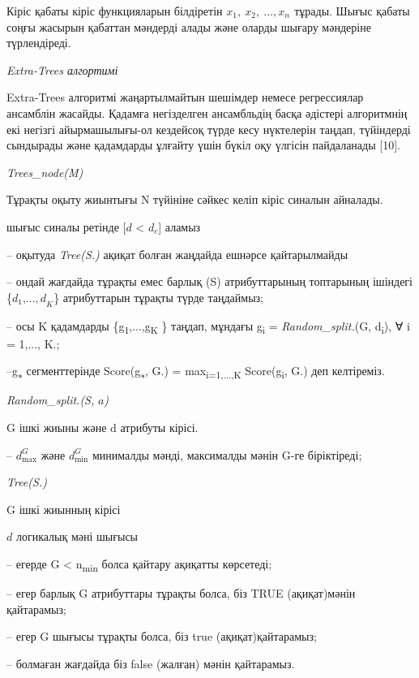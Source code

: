 \begin{multicols}{2}
Кіріс қабаты кіріс функцияларын білдіретін
\(x_{1},\ x_{2},\ ...,x_{n\ }\ \)тұрады. Шығыс қабаты соңғы жасырын
қабаттан мәндерді алады және оларды шығару мәндеріне түрлендіреді.

\emph{Extra-Trees алгортимі}

Extra-Trees алгоритмі жаңартылмайтын шешімдер немесе регрессиялар
ансамблін жасайды. Қадамға негізделген ансамбльдің басқа әдістері
алгоритмнің екі негізгі айырмашылығы-ол кездейсоқ түрде кесу нүктелерін
таңдап, түйіндерді сындырады және қадамдарды ұлғайту үшін бүкіл оқу
үлгісін пайдаланады {[}10{]}.

\emph{Trees\_node(M)}

Тұрақты оқыту жиынтығы N түйініне сәйкес келіп кіріс синалын айналады.

шығыс синалы ретінде {[}\(d\) \textless{} \(d_{c}\){]} аламыз

-- оқытуда \emph{Tree(S.)} ақиқат болған жаңдайда ешнәрсе қайтарылмайды

-- ондай жағдайда тұрақты емес барлық (S) атрибуттарының топтарының
ішіндегі \{\(d_{1}\),...\({,d}_{K}\)\} атрибуттарын тұрақты түрде
таңдаймыз;

-- осы K қадамдарды \{g\textsubscript{1},...,g\textsubscript{K} \}
таңдап, мұндағы g\textsubscript{i} = \emph{Random\_split.}(G,
d\textsubscript{i}), ∀ i = 1,..., K.;

--g\textsubscript{∗} сегменттерінде Score(g\textsubscript{∗}, G.) =
max\textsubscript{i=1,...,K} Score(g\textsubscript{i}, G.) деп
келтіреміз.

\emph{Random\_split.(S,} \(a\)\emph{)}

G ішкі жиыны және d атрибуты кірісі.

-- \(d_{\max}^{G}\) және \(d_{\min}^{G}\) минималды мәнді, максималды
мәнін G-ге біріктіреді;

\emph{Tree(S.)}

G ішкі жиынның кірісі

\(d\) логикалық мәні шығысы

-- егерде \textbar{} G \textbar{} \textless{} n\textsubscript{min} болса
қайтару ақиқатты көрсетеді;

-- егер барлық G атрибуттары тұрақты болса, біз TRUE (ақиқат)мәнін
қайтарамыз;

-- егер G шығысы тұрақты болса, біз true (ақиқат)қайтарамыз;

-- болмаған жағдайда біз false (жалған) мәнін қайтарамыз.


\end{multicols}
